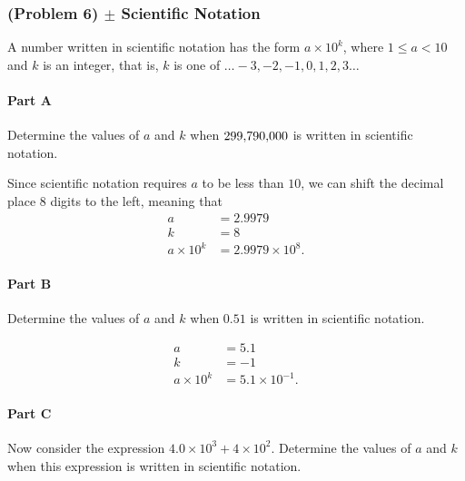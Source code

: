 \newpage

\subsubsection{(Problem 6) $\pm$ Scientific Notation}

A number written in scientific notation has the form $a \times 10^{k}$, where $1 \le a < 10$ and $k$ is an integer, that is, $k$ is one of $\ldots -3, -2, -1, 0, 1, 2, 3 \ldots$

\paragraph{Part A}
Determine the values of $a$ and $k$ when $299{\small,}790{\small,}000$ is written in scientific notation.

\vspace{1em}

\begin{solution}
	Since scientific notation requires $a$ to be less than $10$, we can shift the decimal place $8$ digits to the left, meaning that
	\begin{align*}
		a &= 2.9979 \\
		k &= 8 \\
		a \times 10^{k} &= 2.9979 \times 10^{8}
		.\end{align*}
\end{solution}

\paragraph{Part B}
Determine the values of $a$ and $k$ when $0.51$ is written in scientific notation.

\vspace{1em}

\begin{solution}
	\begin{align*}
		a &= 5.1 \\
		k &= -1 \\
		a \times 10^{k} &= 5.1 \times 10^{-1}
		.\end{align*}
\end{solution}

\paragraph{Part C}
Now consider the expression $4.0 \times 10^{3} + 4 \times 10^2$. Determine the values of $a$ and $k$ when this expression is written in scientific notation.

